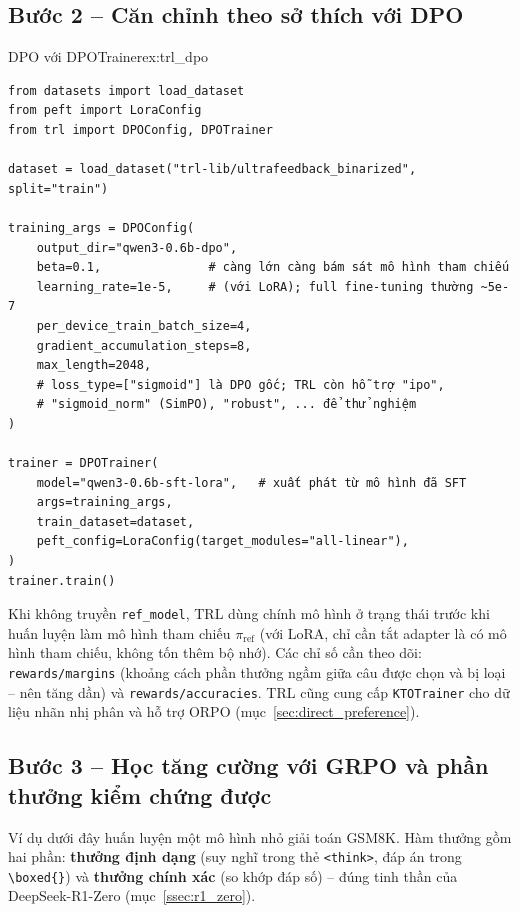 \subsection{Bước 2 -- Căn chỉnh theo sở thích với DPO}
\label{ssec:trl_dpo}
\begin{example}{DPO với DPOTrainer}{ex:trl_dpo}
\begin{verbatim}
from datasets import load_dataset
from peft import LoraConfig
from trl import DPOConfig, DPOTrainer

dataset = load_dataset("trl-lib/ultrafeedback_binarized", split="train")

training_args = DPOConfig(
    output_dir="qwen3-0.6b-dpo",
    beta=0.1,               # càng lớn càng bám sát mô hình tham chiếu
    learning_rate=1e-5,     # (với LoRA); full fine-tuning thường ~5e-7
    per_device_train_batch_size=4,
    gradient_accumulation_steps=8,
    max_length=2048,
    # loss_type=["sigmoid"] là DPO gốc; TRL còn hỗ trợ "ipo",
    # "sigmoid_norm" (SimPO), "robust", ... để thử nghiệm
)

trainer = DPOTrainer(
    model="qwen3-0.6b-sft-lora",   # xuất phát từ mô hình đã SFT
    args=training_args,
    train_dataset=dataset,
    peft_config=LoraConfig(target_modules="all-linear"),
)
trainer.train()
\end{verbatim}
\end{example}
Khi không truyền \texttt{ref\_model}, TRL dùng chính mô hình ở trạng thái trước khi huấn luyện làm mô hình tham chiếu $\pi_{\text{ref}}$ (với LoRA, chỉ cần tắt adapter là có mô hình tham chiếu, không tốn thêm bộ nhớ). Các chỉ số cần theo dõi: \texttt{rewards/margins} (khoảng cách phần thưởng ngầm giữa câu được chọn và bị loại -- nên tăng dần) và \texttt{rewards/accuracies}. TRL cũng cung cấp \texttt{KTOTrainer} cho dữ liệu nhãn nhị phân và hỗ trợ ORPO (mục~\ref{sec:direct_preference}).

\subsection{Bước 3 -- Học tăng cường với GRPO và phần thưởng kiểm chứng được}
\label{ssec:trl_grpo}
Ví dụ dưới đây huấn luyện một mô hình nhỏ giải toán GSM8K. Hàm thưởng gồm hai phần: \textbf{thưởng định dạng} (suy nghĩ trong thẻ \texttt{<think>}, đáp án trong \texttt{\textbackslash boxed\{\}}) và \textbf{thưởng chính xác} (so khớp đáp số) -- đúng tinh thần của DeepSeek-R1-Zero (mục~\ref{ssec:r1_zero}).

